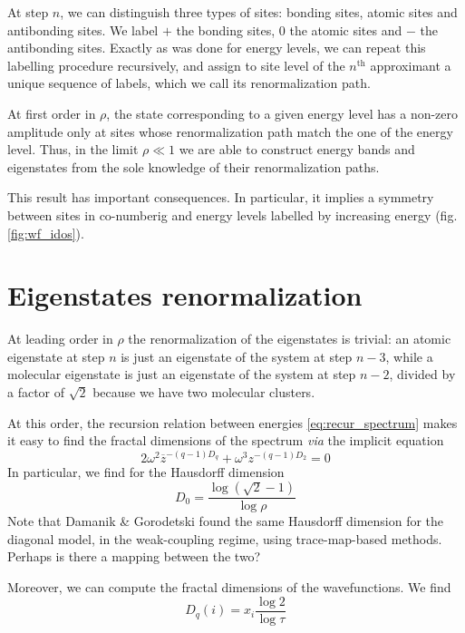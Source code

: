\documentclass[11pt]{article}
\newcommand{\zb}{\ensuremath{\overline{z}}}
\begin{document}
At step $n$, we can distinguish three types of sites: bonding sites, atomic sites and antibonding sites.
We label $+$ the bonding sites, $0$ the atomic sites and $-$ the antibonding sites.
Exactly as was done for energy levels, we can repeat this labelling procedure recursively, and assign to site level of the $n^\text{th}$ approximant a unique sequence of labels, which we call its renormalization path.

At first order in $\rho$, the state corresponding to a given energy level has a non-zero amplitude only at sites whose renormalization path match the one of the energy level.
Thus, in the limit $\rho \ll 1$ we are able to construct energy bands and eigenstates from the sole knowledge of their renormalization paths. 

This result has important consequences. In particular, it implies a symmetry between sites in co-numberig and energy levels labelled by increasing energy (fig. \eqref{fig:wf_idos}).

\section{Eigenstates renormalization}

At leading order in $\rho$ the renormalization of the eigenstates is trivial: an atomic eigenstate at step $n$ is just an eigenstate of the system at step $n-3$, while a molecular eigenstate is just an eigenstate of the system at step $n-2$, divided by a factor of $\sqrt{2}$ because we have two molecular clusters.

At this order, the recursion relation between energies \eqref{eq:recur_spectrum} makes it easy to find the fractal dimensions of the spectrum \cite{Piechon95} \emph{via} the implicit equation
\begin{equation}
	2 \omega^2 \zb^{-(q-1)D_q}+\omega^3 z^{-(q-1)D_2} = 0
\end{equation}
In particular, we find for the Hausdorff dimension
\begin{equation}
	D_0 = \frac{\log( \sqrt{2} -1 )}{\log \rho}
\end{equation}
Note that Damanik \& Gorodetski \cite{DamanikGorodetski} found the same Hausdorff dimension for the diagonal model, in the weak-coupling regime, using trace-map-based methods. Perhaps is there a mapping between the two?

Moreover, we can compute the fractal dimensions of the wavefunctions. We find
\begin{equation}
	D_q(i) = x_i \frac{\log 2}{\log \tau}
\end{equation}
\end{document}
